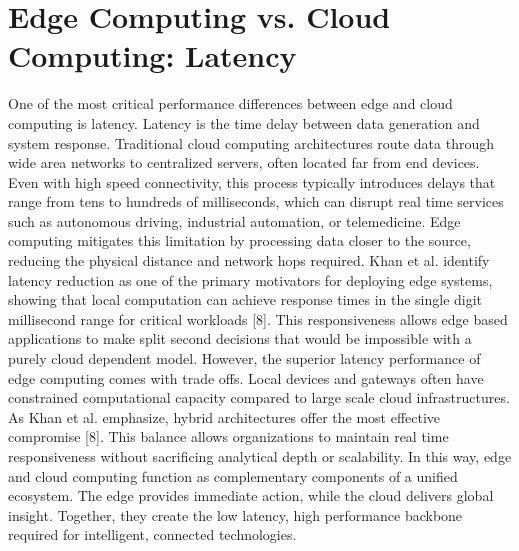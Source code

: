 \documentclass[conference]{IEEEtran}
\begin{document}
\section{Edge Computing vs. Cloud Computing: Latency}
One of the most critical performance differences between edge and cloud computing is latency. Latency is the time delay between data generation and system response. Traditional cloud computing architectures route data through wide area networks to centralized servers, often located far from end devices. Even with high speed connectivity, this process typically introduces delays that range from tens to hundreds of milliseconds, which can disrupt real time services such as autonomous driving, industrial automation, or telemedicine. Edge computing mitigates this limitation by processing data closer to the source, reducing the physical distance and network hops required. Khan et al. identify latency reduction as one of the primary motivators for deploying edge systems, showing that local computation can achieve response times in the single digit millisecond range for critical workloads [8]. This responsiveness allows edge based applications to make split second decisions that would be impossible with a purely cloud dependent model.
However, the superior latency performance of edge computing comes with trade offs. Local devices and gateways often have constrained computational capacity compared to large scale cloud infrastructures. As Khan et al. emphasize, hybrid architectures offer the most effective compromise [8]. This balance allows organizations to maintain real time responsiveness without sacrificing analytical depth or scalability. In this way, edge and cloud computing function as complementary components of a unified ecosystem. The edge provides immediate action, while the cloud delivers global insight. Together, they create the low latency, high performance backbone required for intelligent, connected technologies.
\end{document}
